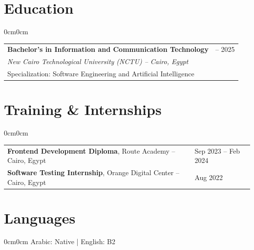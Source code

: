 \documentclass[10pt, letterpaper]{article}
\newenvironment{onecolentry}{\begin{adjustwidth}{0cm}{0cm}}{\end{adjustwidth}}
\begin{document}
\section{Education}
\begin{adjustwidth}{0cm}{0cm}
\begin{tabularx}{\textwidth}{@{} >{\raggedright\arraybackslash}X >{\raggedleft\arraybackslash}p{4.5cm} @{}}
\textbf{Bachelor's in Information and Communication Technology} & 2021 – 2025 \\
\textit{New Cairo Technological University (NCTU) – Cairo, Egypt} & \\
Specialization: Software Engineering and Artificial Intelligence & \\
\end{tabularx}
\end{adjustwidth}

\section{Training \& Internships}
\begin{adjustwidth}{0cm}{0cm}
\begin{tabularx}{\textwidth}{@{} >{\raggedright\arraybackslash}X >{\raggedleft\arraybackslash}p{4.5cm} @{}}
\textbf{Frontend Development Diploma}, Route Academy – Cairo, Egypt & Sep 2023 – Feb 2024 \\
\textbf{Software Testing Internship}, Orange Digital Center – Cairo, Egypt & Aug 2022 \\
\end{tabularx}
\end{adjustwidth}

\section{Languages}
\begin{onecolentry}
Arabic: Native \quad | \quad English: B2
\end{onecolentry}
\end{document}
